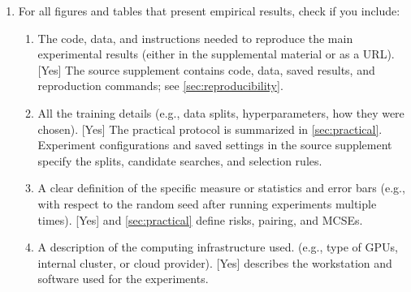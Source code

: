 \begin{enumerate}
      \item For all figures and tables that present empirical results, check if
            you include:
            \begin{enumerate}
                  \item The code, data, and instructions needed to reproduce the
                        main experimental results (either in the supplemental
                        material or as a URL). [Yes] The source supplement
                        contains code, data, saved results, and reproduction
                        commands; see \cref{sec:reproducibility}.
                  \item All the training details (e.g., data splits,
                        hyperparameters, how they were chosen). [Yes] The
                        practical protocol is summarized in
                        \cref{sec:practical}. Experiment configurations and
                        saved settings in the source supplement specify the
                        splits, candidate searches, and selection rules.
                  \item A clear definition of the specific measure or statistics
                        and error bars (e.g., with respect to the random seed
                        after running experiments multiple times). [Yes]
                         and
                        \cref{sec:practical} define risks, pairing, and MCSEs.
                  \item A description of the computing infrastructure used.
                        (e.g., type of GPUs, internal cluster, or cloud
                        provider). [Yes]  describes
                        the workstation and software used for the experiments.
            \end{enumerate}


\end{enumerate}
